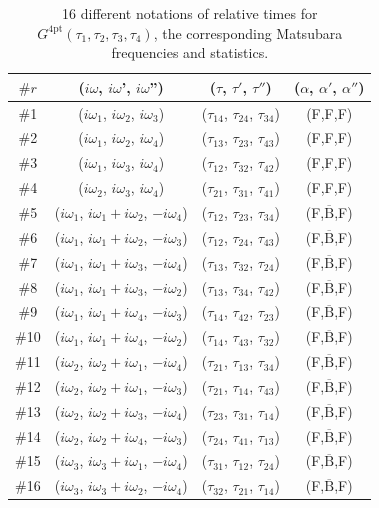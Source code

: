 \documentclass[prb,twocolumn,superscriptaddress]{revtex4-1}
\newcommand{\Gfour}{\ensuremath{G^\mathrm{4pt}}}
\begin{document}
\begin{table}
	\centering
	\begin{tabular}{c|c|c|c}
		\hline
		$\#r$ & ($i\omega$, $i\omega$', $i\omega$'') & ($\tau$, $\tau'$, $\tau''$) & ($\alpha$, $\alpha'$, $\alpha''$) \\
		\hline
		\hline
		\#1 & ($i\omega_1$, $i\omega_2$, $i\omega_3$) & ($\tau_{14}$, $\tau_{24}$, $\tau_{34}$) &  (F,F,F)  \\
		\#2 & ($i\omega_1$, $i\omega_2$, $i\omega_4$) & ($\tau_{13}$, $\tau_{23}$, $\tau_{43}$) &  (F,F,F)  \\
		\#3 & ($i\omega_1$, $i\omega_3$, $i\omega_4$) & ($\tau_{12}$, $\tau_{32}$, $\tau_{42}$) &  (F,F,F)  \\
		\#4 & ($i\omega_2$, $i\omega_3$, $i\omega_4$) & ($\tau_{21}$, $\tau_{31}$, $\tau_{41}$) &  (F,F,F)  \\ \hline
		\#5 & ($i\omega_1$, $i\omega_1 + i\omega_2$, $-i\omega_4$) & ($\tau_{12}$, $\tau_{23}$, $\tau_{34}$) &  (F,$\overline{\mathrm{B}}$,F)  \\
		\#6 & ($i\omega_1$, $i\omega_1 + i\omega_2$, $-i\omega_3$) & ($\tau_{12}$, $\tau_{24}$, $\tau_{43}$) &  (F,$\overline{\mathrm{B}}$,F)  \\
		\#7 & ($i\omega_1$, $i\omega_1 + i\omega_3$, $-i\omega_4$) & ($\tau_{13}$, $\tau_{32}$, $\tau_{24}$) &  (F,$\overline{\mathrm{B}}$,F)  \\
		\#8 & ($i\omega_1$, $i\omega_1 + i\omega_3$, $-i\omega_2$) & ($\tau_{13}$, $\tau_{34}$, $\tau_{42}$) &  (F,$\overline{\mathrm{B}}$,F)  \\
		\#9 & ($i\omega_1$, $i\omega_1 + i\omega_4$, $-i\omega_3$) & ($\tau_{14}$, $\tau_{42}$, $\tau_{23}$) &  (F,$\overline{\mathrm{B}}$,F)  \\
		\#10 & ($i\omega_1$, $i\omega_1 + i\omega_4$, $-i\omega_2$) & ($\tau_{14}$, $\tau_{43}$, $\tau_{32}$) &  (F,$\overline{\mathrm{B}}$,F)  \\
		\#11 & ($i\omega_2$, $i\omega_2 + i\omega_1$, $-i\omega_4$) & ($\tau_{21}$, $\tau_{13}$, $\tau_{34}$) &  (F,$\overline{\mathrm{B}}$,F)  \\
		\#12 & ($i\omega_2$, $i\omega_2 + i\omega_1$, $-i\omega_3$) & ($\tau_{21}$, $\tau_{14}$, $\tau_{43}$) &  (F,$\overline{\mathrm{B}}$,F)  \\
		\#13 & ($i\omega_2$, $i\omega_2 + i\omega_3$, $-i\omega_4$) & ($\tau_{23}$, $\tau_{31}$, $\tau_{14}$) &  (F,$\overline{\mathrm{B}}$,F)  \\
		\#14 & ($i\omega_2$, $i\omega_2 + i\omega_4$, $-i\omega_3$) & ($\tau_{24}$, $\tau_{41}$, $\tau_{13}$) &  (F,$\overline{\mathrm{B}}$,F)  \\
		\#15 & ($i\omega_3$, $i\omega_3 + i\omega_1$, $-i\omega_4$) & ($\tau_{31}$, $\tau_{12}$, $\tau_{24}$) &  (F,$\overline{\mathrm{B}}$,F)  \\
		\#16 & ($i\omega_3$, $i\omega_3 + i\omega_2$, $-i\omega_4$) & ($\tau_{32}$, $\tau_{21}$, $\tau_{14}$) &  (F,$\overline{\mathrm{B}}$,F)  \\
		\hline
	\end{tabular}
	\caption{16 different notations of relative times for $\Gfour(\tau_1,\tau_2,\tau_3,\tau_4)$, the corresponding Matsubara frequencies and statistics.}
	\label{table:summary}
\end{table}
\end{document}
